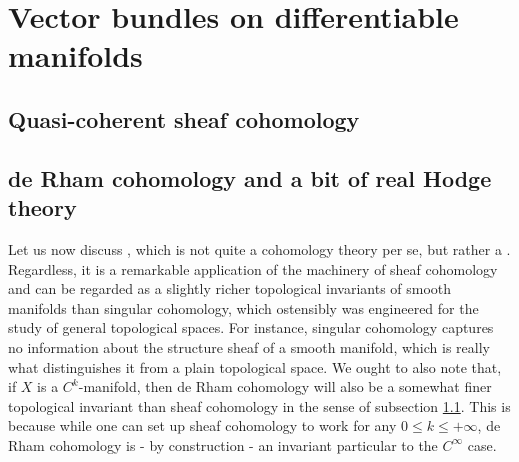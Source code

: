 \section{Vector bundles on differentiable manifolds}
    \subsection{Quasi-coherent sheaf cohomology} \label{subsection: quasi_coherent_sheaf_cohomology}

    \subsection{de Rham cohomology and a bit of real Hodge theory}
        Let us now discuss , which is not quite a cohomology theory per se, but rather a . Regardless, it is a remarkable application of the machinery of sheaf cohomology and can be regarded as a slightly richer topological invariants of smooth manifolds than singular cohomology, which ostensibly was engineered for the study of general topological spaces. For instance, singular cohomology captures no information about the structure sheaf of a smooth manifold, which is really what distinguishes it from a plain topological space. We ought to also note that, if $X$ is a $C^k$-manifold, then de Rham cohomology will also be a somewhat finer topological invariant than sheaf cohomology in the sense of subsection \ref{subsection: quasi_coherent_sheaf_cohomology}. This is because while one can set up sheaf cohomology to work for any $0 \leq k \leq +\infty$, de Rham cohomology is - by construction - an invariant particular to the $C^{\infty}$ case.